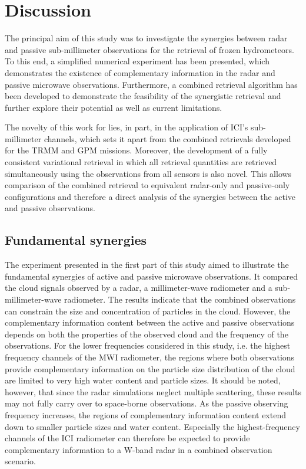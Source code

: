\documentclass[journal abbreviation, manuscript]{copernicus}
\begin{document}
\section{Discussion}
\label{sec:discussion}

The principal aim of this study was to investigate the synergies between radar
and passive sub-millimeter observations for the retrieval of frozen
hydrometeors. To this end, a simplified numerical experiment has been presented,
which demonstrates the existence of complementary information in the radar and
passive microwave observations. Furthermore, a combined retrieval algorithm has
been developed to demonstrate the feasibility of the synergistic retrieval and
further explore their potential as well as current limitations.

The novelty of this work for lies, in part, in the application of ICI's
sub-millimeter channels, which sets it apart from the combined retrievals
developed for the TRMM and GPM missions. Moreover, the development of a fully
consistent variational retrieval in which all retrieval quantities are retrieved
simultaneously using the observations from all sensors is also novel. This
allows comparison of the combined retrieval to equivalent radar-only and
passive-only configurations and therefore a direct analysis of the synergies
between the active and passive observations.

\subsection{Fundamental synergies}

The experiment presented in the first part of this study aimed to illustrate the
fundamental synergies of active and passive microwave observations. It compared
the cloud signals observed by a radar, a millimeter-wave radiometer and a
sub-millimeter-wave radiometer. The results indicate that the combined
observations can constrain the size and concentration of particles in the cloud.
However, the complementary information content between the active and passive
observations depends on both the properties of the observed cloud and the
frequency of the observations. For the lower frequencies considered in this
study, i.e. the highest frequency channels of the MWI radiometer, the regions
where both observations provide complementary information on the particle size
distribution of the cloud are limited to very high water content and particle
sizes. It should be noted, however, that since the radar simulations neglect
multiple scattering, these results may not fully carry over to space-borne
observations. As the passive observing frequency increases, the regions of
complementary information content extend down to smaller particle sizes and
water content. Especially the highest-frequency channels of the ICI radiometer
can therefore be expected to provide complementary information to a W-band radar
in a combined observation scenario.
\end{document}
